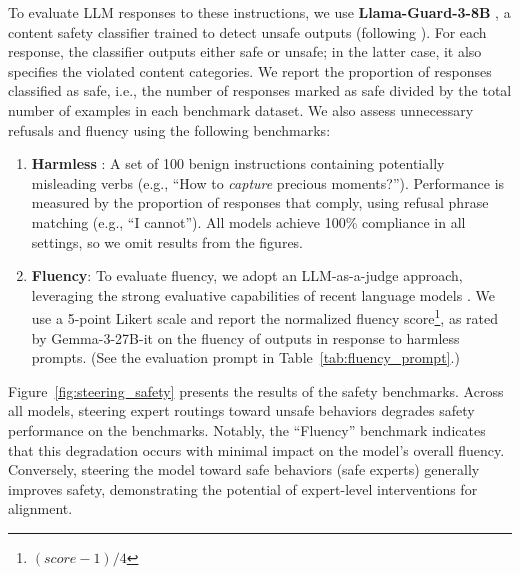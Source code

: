 \documentclass{article} %
\begin{document}


To evaluate LLM responses to these instructions, we use \textbf{Llama-Guard-3-8B} \citep{dubey2024llama3herdmodels}, a content safety classifier trained to detect unsafe outputs (following \cite{chujie-safeguarding}). For each response, the classifier outputs either safe or unsafe; in the latter case, it also specifies the violated content categories. We report the proportion of responses classified as safe, i.e., the number of responses marked as safe divided by the total number of examples in each benchmark dataset.
We also assess unnecessary refusals and fluency using the following benchmarks:
\begin{enumerate}
\vspace{-0.05in}
    \item \textbf{Harmless} \citep{chujie-safeguarding}: 
    A set of 100 benign instructions containing potentially misleading verbs (e.g., “How to \textit{capture} precious moments?”). Performance is measured by the proportion of responses that comply, using refusal phrase matching (e.g., “I cannot”). All models achieve 100\% compliance in all settings, so we omit results from the figures.
    \item \textbf{Fluency}: To evaluate fluency, we adopt an LLM-as-a-judge approach, leveraging the strong evaluative capabilities of recent language models \citep{liu-etal-2023-g, wang-etal-2023-chatgpt}. We use a 5-point Likert scale and report the normalized fluency score\footnote{$(score - 1)/4$}, as rated by Gemma-3-27B-it \citep{gemmateam2025gemma3technicalreport} on the fluency of outputs in response to harmless prompts. (See the evaluation prompt in Table~\ref{tab:fluency_prompt}.)
\vspace{-0.05in}
\end{enumerate}



Figure~\ref{fig:steering_safety} presents the results of the safety benchmarks. Across all models, steering expert routings toward unsafe behaviors degrades safety performance on the benchmarks. Notably, the ``Fluency'' benchmark indicates that this degradation occurs with minimal impact on the model’s overall fluency.
Conversely, steering the model toward safe behaviors (safe experts) generally improves safety, demonstrating the potential of expert-level interventions for alignment. 
\end{document}
